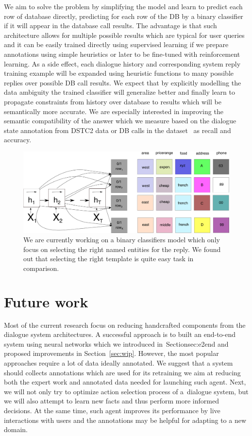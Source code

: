 \documentclass[11pt]{article}
\begin{document}
We aim to solve the problem by simplifying the model and learn to predict each row of database directly, predicting for each row of the DB by a binary classifier if it will appear in the database call results. 
The advantage is that such architecture allows for multiple possible results which are typical for user queries and it can be easily trained directly using supervised learning if we prepare annotations using simple heuristics or later to be fine-tuned with reinforcement learning.
As a side effect, each dialogue history and corresponding system reply training example will be expanded using heuristic functions to many possible replies over possible DB call results.
We expect that by explicitly modelling the data ambiguity the trained classifier will generalize better and finally learn to propagate constraints from history over database to results which will be semantically more accurate.
We are especially interested in improving the semantic compatibility of the answer which we measure based on the dialogue state annotation from DSTC2 data or DB calls in the dataset~\cite{platek2016wochat} as recall and accuracy.
\begin{figure}[ht]
    \centering
    \includegraphics[width=1.0\linewidth]{e2end_dbclassifiers}
    \caption{We are currently working on a binary classifiers model which only focus on selecting the right named entities for the reply. We found out that selecting the right template is quite easy task in comparison.}
\label{fig:e2end_entities}
\end{figure}


\section{Future work}\label{sec:future}

Most of the current research focus on reducing handcrafted components from the dialogue system architectures.
A successful approach is to built an end-to-end system using neural networks which we introduced in~Section{sec:e2end} and proposed improvements in Section~\ref{sec:wip}. 
However, the most popular approaches require a lot of data ideally annotated.
We suggest that a system should collects annotations which are used for its retraining we aim at reducing both the expert work and annotated data needed for launching such agent.
Next, we will not only try to optimize action selection process of a~dialogue system, but we will also attempt to learn new facts and thus perform more informed decisions.
At the same time, such agent improves its performance by live interactions with users and the annotations may be helpful for adapting to a new domain.
\end{document}
